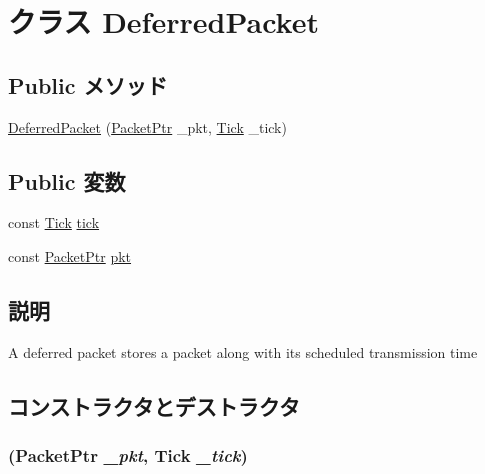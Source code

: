 \hypertarget{classSimpleMemory_1_1DeferredPacket}{
\section{クラス DeferredPacket}
\label{classSimpleMemory_1_1DeferredPacket}
}
\subsection*{Public メソッド}
\begin{DoxyCompactItemize}
\item 
\hyperlink{classSimpleMemory_1_1DeferredPacket_a5353c0a3627930082acb1eb2f8549576}{DeferredPacket} (\hyperlink{classPacket}{PacketPtr} \_\-pkt, \hyperlink{base_2types_8hh_a5c8ed81b7d238c9083e1037ba6d61643}{Tick} \_\-tick)
\end{DoxyCompactItemize}
\subsection*{Public 変数}
\begin{DoxyCompactItemize}
\item 
const \hyperlink{base_2types_8hh_a5c8ed81b7d238c9083e1037ba6d61643}{Tick} \hyperlink{classSimpleMemory_1_1DeferredPacket_a018b1d349ea79fddf1472935835a1d96}{tick}
\item 
const \hyperlink{classPacket}{PacketPtr} \hyperlink{classSimpleMemory_1_1DeferredPacket_a6fb971eb547deb70a1eb9fc09047e9ae}{pkt}
\end{DoxyCompactItemize}


\subsection{説明}
A deferred packet stores a packet along with its scheduled transmission time 

\subsection{コンストラクタとデストラクタ}
\hypertarget{classSimpleMemory_1_1DeferredPacket_a5353c0a3627930082acb1eb2f8549576}{
\subsubsection[{DeferredPacket}]{ ({\bf PacketPtr} {\em \_\-pkt}, \/  {\bf Tick} {\em \_\-tick})}}
\label{classSimpleMemory_1_1DeferredPacket_a5353c0a3627930082acb1eb2f8549576}



